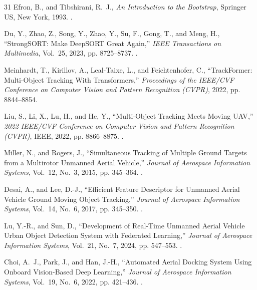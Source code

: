 \documentclass[journal]{new-aiaa}
\begin{document}
\begin{thebibliography}{31}
Efron, B., and Tibshirani, R.~J., \emph{An Introduction to the Bootstrap},
  Springer US, New York, 1993.
\newblock {}.

Du, Y., Zhao, Z., Song, Y., Zhao, Y., Su, F., Gong, T., and Meng, H.,
  \enquote{{StrongSORT: Make DeepSORT Great Again},} \emph{IEEE Transactions on
  Multimedia}, Vol.~25, 2023, pp. 8725--8737.
\newblock {}.

Meinhardt, T., Kirillov, A., Leal-Taixe, L., and Feichtenhofer, C.,
  \enquote{{TrackFormer: Multi-Object Tracking With Transformers},}
  \emph{Proceedings of the IEEE/CVF Conference on Computer Vision and Pattern
  Recognition (CVPR)}, 2022, pp. 8844--8854.

Liu, S., Li, X., Lu, H., and He, Y., \enquote{{Multi-Object Tracking Meets
  Moving UAV},} \emph{2022 IEEE/CVF Conference on Computer Vision and Pattern
  Recognition (CVPR)}, IEEE, 2022, pp. 8866--8875.
\newblock {}.

Miller, N., and Rogers, J., \enquote{{Simultaneous Tracking of Multiple Ground
  Targets from a Multirotor Unmanned Aerial Vehicle},} \emph{Journal of
  Aerospace Information Systems}, Vol.~12, No.~3, 2015, pp. 345--364.
\newblock {}.

Desai, A., and Lee, D.-J., \enquote{{Efficient Feature Descriptor for Unmanned
  Aerial Vehicle Ground Moving Object Tracking},} \emph{Journal of Aerospace
  Information Systems}, Vol.~14, No.~6, 2017, pp. 345--350.
\newblock {}.

Lu, Y.-R., and Sun, D., \enquote{{Development of Real-Time Unmanned Aerial
  Vehicle Urban Object Detection System with Federated Learning},}
  \emph{Journal of Aerospace Information Systems}, Vol.~21, No.~7, 2024, pp.
  547--553.
\newblock {}.

Choi, A.~J., Park, J., and Han, J.-H., \enquote{{Automated Aerial Docking
  System Using Onboard Vision-Based Deep Learning},} \emph{Journal of Aerospace
  Information Systems}, Vol.~19, No.~6, 2022, pp. 421--436.
\newblock {}.


\end{thebibliography}
\end{document}
